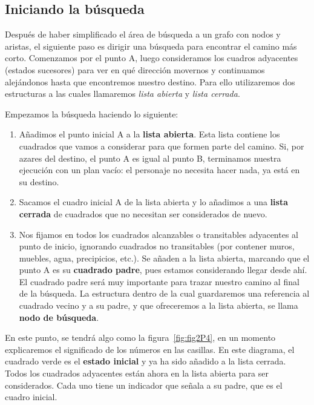 \subsection{Iniciando la b\'usqueda}

Después de haber simplificado el área de búsqueda a un grafo con nodos y aristas, el siguiente paso es dirigir una búsqueda para encontrar el camino más corto.  Comenzamos por el punto A, luego consideramos los cuadros adyacentes (estados sucesores) para ver en qué dirección movernos y continuamos alejándonos hasta que encontremos nuestro destino.  Para ello utilizaremos dos estructuras a las cuales llamaremos \emph{lista abierta} y \emph{lista cerrada}.

\noindent Empezamos la búsqueda haciendo lo siguiente:

\begin{enumerate}
  \item Añadimos el punto inicial A a la \textbf{lista abierta}. Esta lista contiene los cuadrados que vamos a considerar para que formen parte del camino. Si, por azares del destino, el punto A es igual al punto B, terminamos nuestra ejecución con un plan vacío: el personaje no necesita hacer nada, ya está en su destino.
  
  \item Sacamos el cuadro inicial A de la lista abierta y lo añadimos a una \textbf{lista cerrada} de cuadrados que no necesitan ser considerados de nuevo.
  
  \item Nos fijamos en todos los cuadrados alcanzables o transitables adyacentes al punto de inicio, ignorando cuadrados no transitables (por contener muros, muebles, agua, precipicios, etc.). Se añaden a la lista abierta, marcando que el punto A es su \textbf{cuadrado padre}, pues estamos considerando llegar desde ahí. El cuadrado padre será muy importante para trazar nuestro camino al final de la búsqueda.  La estructura dentro de la cual guardaremos una referencia al cuadrado vecino y a su padre, y que ofreceremos a la lista abierta, se llama \textbf{nodo de búsqueda}.
\end{enumerate}

En este punto, se tendrá algo como la figura~\ref{fig:fig2P4}, en un momento explicaremos el significado de los números en las casillas. En este diagrama, el cuadrado verde es el \textbf{estado inicial} y ya ha sido añadido a la lista cerrada. Todos los cuadrados adyacentes están ahora en la lista abierta para ser considerados. Cada uno tiene un indicador que señala a su padre, que es el cuadro inicial.


